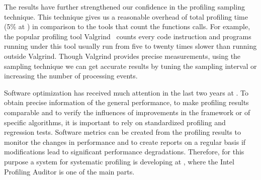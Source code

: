 The results have further strengthened our confidence in the profiling sampling
technique. This technique gives us a reasonable overhead of total profiling
time (5\% at \iamp) in comparison to the tools that count the functions calls.
For example, the popular profiling tool Valgrind~\cite{valgrind} counts every
code instruction and programs running under this tool usually run from five to
twenty times  slower than running outside Valgrind. Though Valgrind provides
precise measurements, using the sampling technique we can get accurate results
by tuning the sampling interval or increasing the number of processing events.

Software optimization has received much attention in the last two years at
\lhcb. To obtain precise information of the general performance, to make
profiling results comparable and to verify the influences of improvements in
the framework or of specific algorithms, it is important to rely on
standardized profiling and regression tests. Software metrics can be created
from the profiling results to monitor the changes in performance and to create
reports on a regular basis if modifications lead to significant
performance degradations. Therefore, for this purpose a system for systematic
profiling is developing at \lhcb, where the \gaudi Intel Profiling Auditor
is one of the main parts.